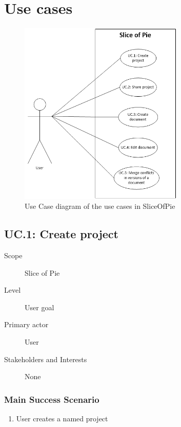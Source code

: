 \section{Use cases}
\label{sec:use-cases}

\begin{figure}[htb]
	\centering
	\includegraphics[width=0.7\textwidth]{Appendices/graphics/use-cases-01.png}
	\caption{Use Case diagram of the use cases in SliceOfPie}
	\label{fig:use-cases-01}
\end{figure}

\subsection{UC.1: Create project}
\begin{description}
    \item[Scope] Slice of Pie
    \item[Level] User goal
    \item[Primary actor] User
    \item[Stakeholders and Interests] None
\end{description}
    
\subsubsection{Main Success Scenario}
\begin{enumerate}
    \item User creates a named project
\end{enumerate}
    
